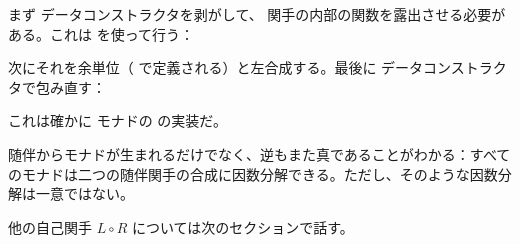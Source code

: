 まず  データコンストラクタを剥がして、 関手の内部の関数を露出させる必要がある。これは  を使って行う：

次にそれを余単位（ で定義される）と左合成する。最後に  データコンストラクタで包み直す：

これは確かに  モナドの  の実装だ。

随伴からモナドが生まれるだけでなく、逆もまた真であることがわかる：すべてのモナドは二つの随伴関手の合成に因数分解できる。ただし、そのような因数分解は一意ではない。

他の自己関手 $L \circ R$ については次のセクションで話す。
